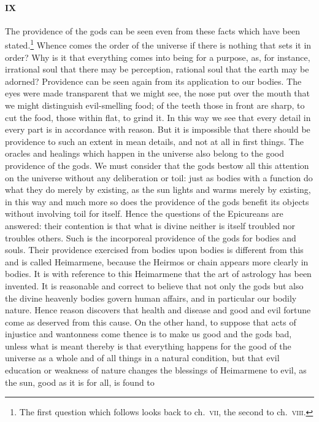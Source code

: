 \documentclass[12pt]{article}
\begin{document}
\paragraph{IX} The providence of the gods can be seen even from these facts
which have been stated.\footnote{The first question which follows looks back to
ch.~\textsc{vii}, the second to ch.~\textsc{viii}.} Whence comes the order of
the universe if there is nothing that sets it in order? Why is it that
everything comes into being for a purpose, as, for instance, irrational soul
that there may be perception, rational soul that the earth may be adorned?
Providence can be seen again from its application to our bodies. The eyes were
made transparent that we might see, the nose put over the mouth that we might
distinguish evil-smelling food; of the teeth those in front are sharp, to cut
the food, those within flat, to grind it. In this way we see that every detail
in every part is in accordance with reason. But it is impossible that there
should be providence to such an extent in mean details, and not at all in first
things. The oracles and healings which happen in the universe also belong to
the good providence of the gods. We must consider that the gods bestow all this
attention on the universe without any deliberation or toil: just as bodies with
a function do what they do merely by existing, as the sun lights and warms
merely by existing, in this way and much more so does the providence of the
gods benefit its objects without involving toil for itself. Hence the questions
of the Epicureans are answered: their contention is that what is divine neither
is itself troubled nor troubles others. Such is the incorporeal providence of
the gods for bodies and souls. Their providence exercised from bodies upon
bodies is different from this and is called Heimarmene, because the Heirmos or
chain appears more clearly in bodies. It is with reference to this Heimarmene
that the art of astrology has been invented. It is reasonable and correct to
believe that not only the gods but also the divine heavenly bodies govern human
affairs, and in particular our bodily nature. Hence reason discovers that
health and disease and good and evil fortune come as deserved from this cause.
On the other hand, to suppose that acts of injustice and wantonness come thence
is to make us good and the gods bad, unless what is meant thereby is that
everything happens for the good of the universe as a whole and of all things in
a natural condition, but that evil education or weakness of nature changes the
blessings of Heimarmene to evil, as the sun, good as it is for all, is found to
\end{document}
